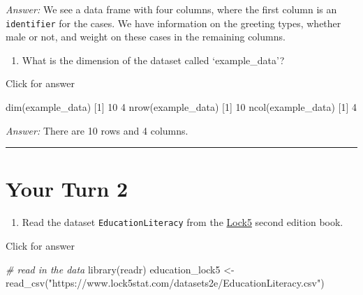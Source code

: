 \documentclass[
]{book}
\newenvironment{Shaded}{\begin{snugshade}}{\end{snugshade}}
\newcommand{\CommentTok}[1]{\textcolor[rgb]{0.56,0.35,0.01}{\textit{#1}}}
\newcommand{\DecValTok}[1]{\textcolor[rgb]{0.00,0.00,0.81}{#1}}
\newcommand{\FunctionTok}[1]{\textcolor[rgb]{0.00,0.00,0.00}{#1}}
\newcommand{\NormalTok}[1]{#1}
\newcommand{\OtherTok}[1]{\textcolor[rgb]{0.56,0.35,0.01}{#1}}
\newcommand{\StringTok}[1]{\textcolor[rgb]{0.31,0.60,0.02}{#1}}
\providecommand{\tightlist}{%
  \setlength{\itemsep}{0pt}\setlength{\parskip}{0pt}}
\begin{document}
\emph{Answer:} We see a data frame with four columns, where the first column is an \texttt{identifier} for the cases. We have information on the greeting types, whether male or not, and weight on these cases in the remaining columns.

\begin{enumerate}
\def\labelenumi{\alph{enumi}.}
\setcounter{enumi}{1}
\tightlist
\item
  What is the dimension of the dataset called `example\_data'?
\end{enumerate}

Click for answer

\begin{Shaded}
\begin{Highlighting}[]
\FunctionTok{dim}\NormalTok{(example\_data)}
\NormalTok{[}\DecValTok{1}\NormalTok{] }\DecValTok{10}  \DecValTok{4}
\FunctionTok{nrow}\NormalTok{(example\_data)}
\NormalTok{[}\DecValTok{1}\NormalTok{] }\DecValTok{10}
\FunctionTok{ncol}\NormalTok{(example\_data)}
\NormalTok{[}\DecValTok{1}\NormalTok{] }\DecValTok{4}
\end{Highlighting}
\end{Shaded}

\emph{Answer:} There are 10 rows and 4 columns.

\begin{center}\rule{0.5\linewidth}{0.5pt}\end{center}

\hypertarget{your-turn-2}{%
\section{Your Turn 2}\label{your-turn-2}}

\begin{enumerate}
\def\labelenumi{\alph{enumi}.}
\tightlist
\item
  Read the dataset \texttt{EducationLiteracy} from the \href{https://www.lock5stat.com/datapage2e.html}{Lock5} second edition book.
\end{enumerate}

Click for answer

\begin{Shaded}
\begin{Highlighting}[]
\CommentTok{\# read in the data}
\FunctionTok{library}\NormalTok{(readr)}
\NormalTok{education\_lock5 }\OtherTok{\textless{}{-}} \FunctionTok{read\_csv}\NormalTok{(}\StringTok{"https://www.lock5stat.com/datasets2e/EducationLiteracy.csv"}\NormalTok{)}
\end{Highlighting}
\end{Shaded}
\end{document}
